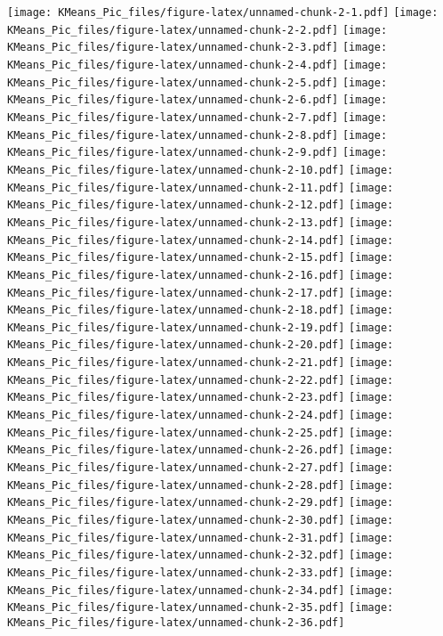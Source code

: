 \documentclass[]{article}
\begin{document}
\texttt{[image: KMeans\_Pic\_files/figure-latex/unnamed-chunk-2-1.pdf]}
\texttt{[image: KMeans\_Pic\_files/figure-latex/unnamed-chunk-2-2.pdf]}
\texttt{[image: KMeans\_Pic\_files/figure-latex/unnamed-chunk-2-3.pdf]}
\texttt{[image: KMeans\_Pic\_files/figure-latex/unnamed-chunk-2-4.pdf]}
\texttt{[image: KMeans\_Pic\_files/figure-latex/unnamed-chunk-2-5.pdf]}
\texttt{[image: KMeans\_Pic\_files/figure-latex/unnamed-chunk-2-6.pdf]}
\texttt{[image: KMeans\_Pic\_files/figure-latex/unnamed-chunk-2-7.pdf]}
\texttt{[image: KMeans\_Pic\_files/figure-latex/unnamed-chunk-2-8.pdf]}
\texttt{[image: KMeans\_Pic\_files/figure-latex/unnamed-chunk-2-9.pdf]}
\texttt{[image: KMeans\_Pic\_files/figure-latex/unnamed-chunk-2-10.pdf]}
\texttt{[image: KMeans\_Pic\_files/figure-latex/unnamed-chunk-2-11.pdf]}
\texttt{[image: KMeans\_Pic\_files/figure-latex/unnamed-chunk-2-12.pdf]}
\texttt{[image: KMeans\_Pic\_files/figure-latex/unnamed-chunk-2-13.pdf]}
\texttt{[image: KMeans\_Pic\_files/figure-latex/unnamed-chunk-2-14.pdf]}
\texttt{[image: KMeans\_Pic\_files/figure-latex/unnamed-chunk-2-15.pdf]}
\texttt{[image: KMeans\_Pic\_files/figure-latex/unnamed-chunk-2-16.pdf]}
\texttt{[image: KMeans\_Pic\_files/figure-latex/unnamed-chunk-2-17.pdf]}
\texttt{[image: KMeans\_Pic\_files/figure-latex/unnamed-chunk-2-18.pdf]}
\texttt{[image: KMeans\_Pic\_files/figure-latex/unnamed-chunk-2-19.pdf]}
\texttt{[image: KMeans\_Pic\_files/figure-latex/unnamed-chunk-2-20.pdf]}
\texttt{[image: KMeans\_Pic\_files/figure-latex/unnamed-chunk-2-21.pdf]}
\texttt{[image: KMeans\_Pic\_files/figure-latex/unnamed-chunk-2-22.pdf]}
\texttt{[image: KMeans\_Pic\_files/figure-latex/unnamed-chunk-2-23.pdf]}
\texttt{[image: KMeans\_Pic\_files/figure-latex/unnamed-chunk-2-24.pdf]}
\texttt{[image: KMeans\_Pic\_files/figure-latex/unnamed-chunk-2-25.pdf]}
\texttt{[image: KMeans\_Pic\_files/figure-latex/unnamed-chunk-2-26.pdf]}
\texttt{[image: KMeans\_Pic\_files/figure-latex/unnamed-chunk-2-27.pdf]}
\texttt{[image: KMeans\_Pic\_files/figure-latex/unnamed-chunk-2-28.pdf]}
\texttt{[image: KMeans\_Pic\_files/figure-latex/unnamed-chunk-2-29.pdf]}
\texttt{[image: KMeans\_Pic\_files/figure-latex/unnamed-chunk-2-30.pdf]}
\texttt{[image: KMeans\_Pic\_files/figure-latex/unnamed-chunk-2-31.pdf]}
\texttt{[image: KMeans\_Pic\_files/figure-latex/unnamed-chunk-2-32.pdf]}
\texttt{[image: KMeans\_Pic\_files/figure-latex/unnamed-chunk-2-33.pdf]}
\texttt{[image: KMeans\_Pic\_files/figure-latex/unnamed-chunk-2-34.pdf]}
\texttt{[image: KMeans\_Pic\_files/figure-latex/unnamed-chunk-2-35.pdf]}
\texttt{[image: KMeans\_Pic\_files/figure-latex/unnamed-chunk-2-36.pdf]}
\end{document}
